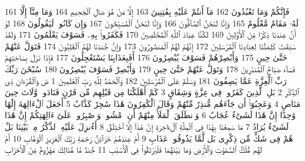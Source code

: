 {\tiny\colorbox{cl_aya}{161}} فَإِنَّكُمْ وَمَا تَعْبُدُونَ
{\tiny\colorbox{cl_aya}{162}} مَآ أَنتُمْ عَلَيْهِ بِفَٰتِنِينَ
{\tiny\colorbox{cl_aya}{163}} إِلَّا مَنْ هُوَ صَالِ ٱلْجَحِيمِ
{\tiny\colorbox{cl_aya}{164}} وَمَا مِنَّآ إِلَّا لَهُۥ مَقَامٌ مَّعْلُومٌ
{\tiny\colorbox{cl_aya}{165}} وَإِنَّا لَنَحْنُ ٱلصَّآفُّونَ
{\tiny\colorbox{cl_aya}{166}} وَإِنَّا لَنَحْنُ ٱلْمُسَبِّحُونَ
{\tiny\colorbox{cl_aya}{167}} وَإِن كَانُوا۟ لَيَقُولُونَ
{\tiny\colorbox{cl_aya}{168}} لَوْ أَنَّ عِندَنَا ذِكْرًا مِّنَ ٱلْأَوَّلِينَ
{\tiny\colorbox{cl_aya}{169}} لَكُنَّا عِبَادَ ٱللَّهِ ٱلْمُخْلَصِينَ
{\tiny\colorbox{cl_aya}{170}} فَكَفَرُوا۟ بِهِۦ فَسَوْفَ يَعْلَمُونَ
{\tiny\colorbox{cl_aya}{171}} وَلَقَدْ سَبَقَتْ كَلِمَتُنَا لِعِبَادِنَا ٱلْمُرْسَلِينَ
{\tiny\colorbox{cl_aya}{172}} إِنَّهُمْ لَهُمُ ٱلْمَنصُورُونَ
{\tiny\colorbox{cl_aya}{173}} وَإِنَّ جُندَنَا لَهُمُ ٱلْغَٰلِبُونَ
{\tiny\colorbox{cl_aya}{174}} فَتَوَلَّ عَنْهُمْ حَتَّىٰ حِينٍ
{\tiny\colorbox{cl_aya}{175}} وَأَبْصِرْهُمْ فَسَوْفَ يُبْصِرُونَ
{\tiny\colorbox{cl_aya}{176}} أَفَبِعَذَابِنَا يَسْتَعْجِلُونَ
{\tiny\colorbox{cl_aya}{177}} فَإِذَا نَزَلَ بِسَاحَتِهِمْ فَسَآءَ صَبَاحُ ٱلْمُنذَرِينَ
{\tiny\colorbox{cl_aya}{178}} وَتَوَلَّ عَنْهُمْ حَتَّىٰ حِينٍ
{\tiny\colorbox{cl_aya}{179}} وَأَبْصِرْ فَسَوْفَ يُبْصِرُونَ
{\tiny\colorbox{cl_aya}{180}} سُبْحَٰنَ رَبِّكَ رَبِّ ٱلْعِزَّةِ عَمَّا يَصِفُونَ
{\tiny\colorbox{cl_aya}{181}} وَسَلَٰمٌ عَلَى ٱلْمُرْسَلِينَ
{\tiny\colorbox{cl_aya}{182}} وَٱلْحَمْدُ لِلَّهِ رَبِّ ٱلْعَٰلَمِينَ
{\tiny\colorbox{cl_aya}{1}} صٓ وَٱلْقُرْءَانِ ذِى ٱلذِّكْرِ
{\tiny\colorbox{cl_aya}{2}} بَلِ ٱلَّذِينَ كَفَرُوا۟ فِى عِزَّةٍ وَشِقَاقٍ
{\tiny\colorbox{cl_aya}{3}} كَمْ أَهْلَكْنَا مِن قَبْلِهِم مِّن قَرْنٍ فَنَادَوا۟ وَّلَاتَ حِينَ مَنَاصٍ
{\tiny\colorbox{cl_aya}{4}} وَعَجِبُوٓا۟ أَن جَآءَهُم مُّنذِرٌ مِّنْهُمْ وَقَالَ ٱلْكَٰفِرُونَ هَٰذَا سَٰحِرٌ كَذَّابٌ
{\tiny\colorbox{cl_aya}{5}} أَجَعَلَ ٱلْءَالِهَةَ إِلَٰهًا وَٰحِدًا إِنَّ هَٰذَا لَشَىْءٌ عُجَابٌ
{\tiny\colorbox{cl_aya}{6}} وَٱنطَلَقَ ٱلْمَلَأُ مِنْهُمْ أَنِ ٱمْشُوا۟ وَٱصْبِرُوا۟ عَلَىٰٓ ءَالِهَتِكُمْ إِنَّ هَٰذَا لَشَىْءٌ يُرَادُ
{\tiny\colorbox{cl_aya}{7}} مَا سَمِعْنَا بِهَٰذَا فِى ٱلْمِلَّةِ ٱلْءَاخِرَةِ إِنْ هَٰذَآ إِلَّا ٱخْتِلَٰقٌ
{\tiny\colorbox{cl_aya}{8}} أَءُنزِلَ عَلَيْهِ ٱلذِّكْرُ مِنۢ بَيْنِنَا بَلْ هُمْ فِى شَكٍّ مِّن ذِكْرِى بَل لَّمَّا يَذُوقُوا۟ عَذَابِ
{\tiny\colorbox{cl_aya}{9}} أَمْ عِندَهُمْ خَزَآئِنُ رَحْمَةِ رَبِّكَ ٱلْعَزِيزِ ٱلْوَهَّابِ
{\tiny\colorbox{cl_aya}{10}} أَمْ لَهُم مُّلْكُ ٱلسَّمَٰوَٰتِ وَٱلْأَرْضِ وَمَا بَيْنَهُمَا فَلْيَرْتَقُوا۟ فِى ٱلْأَسْبَٰبِ
{\tiny\colorbox{cl_aya}{11}} جُندٌ مَّا هُنَالِكَ مَهْزُومٌ مِّنَ ٱلْأَحْزَابِ
